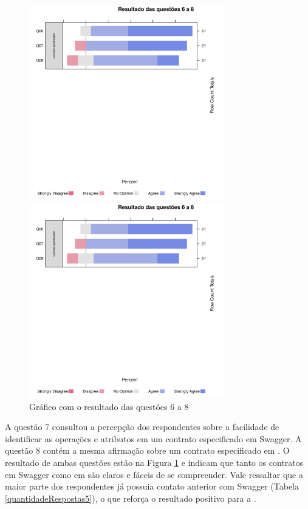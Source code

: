 \begin{figure}[!htb]
\centering
\includegraphics[width=85mm,trim = 6mm 115mm 6mm 
10mm,clip]{img/GraficoResultadoQuestoes6a8.pdf}

\includegraphics[width=85mm,trim = 6mm 0mm 6mm 
170mm,clip]{img/GraficoResultadoQuestoes6a8.pdf}

\caption{Gráfico com o resultado das questões 6 a 8}
\label{Respostas6a8}
\end{figure}

A questão 7 consultou a percepção dos respondentes sobre a facilidade de
identificar as operações e atributos em um contrato especificado em Swagger. A
questão 8 contém a mesma afirmação sobre um contrato especificado em \neoidl{}.
O resultado de ambas questões estão na Figura \ref{Respostas6a8} e indicam que
tanto os contratos em Swagger como em \neoidl{} são claros e fáceis de se compreender. Vale ressaltar que a maior parte dos
respondentes já possuia contato anterior com Swagger (Tabela
\ref{quantidadeRespostas5}), o que reforça o resultado positivo para a
\neoidl{}.


